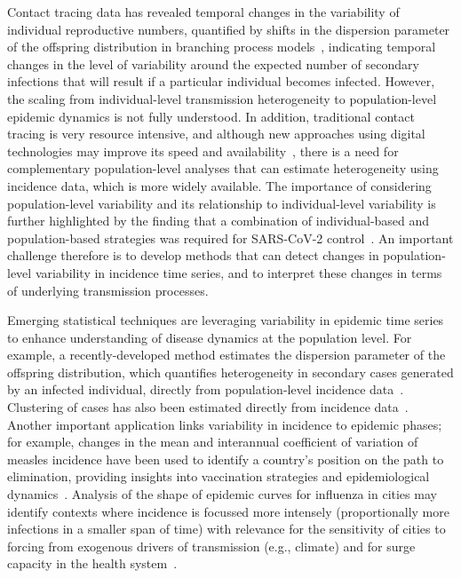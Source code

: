 \documentclass[11pt,letterpaper]{article}
\begin{document}
Contact tracing data has revealed temporal changes in the variability of individual reproductive numbers, quantified by shifts in the dispersion parameter of the offspring distribution in branching process models~\citep{guo2023statistical,ko2023time}, indicating temporal changes in the level of variability around the expected number of secondary infections that will result if a particular individual becomes infected.
However, the scaling from individual-level transmission heterogeneity to population-level epidemic dynamics is not fully understood.
In addition, traditional contact tracing is very resource intensive, and although new approaches using digital technologies may improve its speed and availability~\citep{kretzschmar2020impact}, there is a need for complementary population-level analyses that can estimate heterogeneity using incidence data, which is more widely available.
The importance of considering population-level variability and its relationship to individual-level variability is further highlighted by the finding that a combination of individual-based and population-based strategies was required for SARS-CoV-2 control~\citep{sun2021transmission}. 
An important challenge therefore is to develop methods that can detect changes in population-level variability in incidence time series, and to interpret these changes in terms of underlying transmission processes.

Emerging statistical techniques are leveraging variability in epidemic time series to enhance understanding of disease dynamics at the population level. 
For example, a recently-developed method estimates the dispersion parameter of the offspring distribution, which quantifies heterogeneity in secondary cases generated by an infected individual, directly from population-level incidence data~\citep{kirkegaard2021superspreading}. 
Clustering of cases has also been estimated directly from incidence data~\citep{schneckenreither2023assessing}.
Another important application links variability in incidence to epidemic phases; for example, changes in the mean and interannual coefficient of variation of measles incidence have been used to identify a country’s position on the path to elimination, providing insights into vaccination strategies and epidemiological dynamics~\citep{graham2019measles}. 
Analysis of the shape of epidemic curves for influenza in cities may identify contexts where incidence is focussed more intensely (proportionally more infections in a smaller span of time) with relevance for the sensitivity of cities to forcing from exogenous drivers of transmission (e.g., climate) and for surge capacity in the health system~\citep{dalziel2018urbanization, wallinga2018metropolitan}. 
\end{document}
